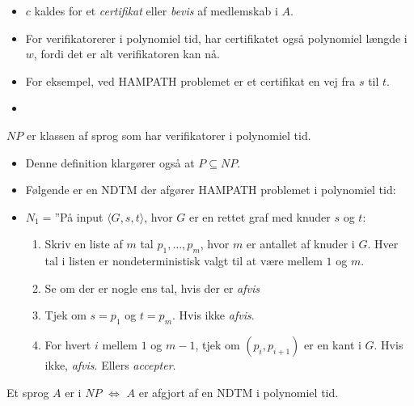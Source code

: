 \begin{frame}[allowframebreaks]
	\begin{itemize}
		\item $c$ kaldes for et \textit{certifikat} eller \textit{bevis} af medlemskab i $A$.
		\item For verifikatorerer i polynomiel tid, har certifikatet også polynomiel længde i $w$, fordi det er alt verifikatoren kan nå.
		\item For eksempel, ved HAMPATH problemet er et certifikat en vej fra $s$ til $t$.
		\item
	\end{itemize}
	\begin{definition}
		$NP$ er klassen af sprog som har verifikatorer i polynomiel tid.
	\end{definition}
	\begin{itemize}
		\item Denne definition klargører også at $P \subseteq NP$.
		\item Følgende er en NDTM der afgører HAMPATH problemet i polynomiel tid:
		\item $N_{1} = $''På input \(\langle G, s, t \rangle\), hvor $G$ er en rettet graf med knuder $s$ og $t$:
		      \begin{enumerate}
			      \item Skriv en liste af $m$ tal $p_{1}, \ldots, p_{m}$, hvor $m$ er antallet af knuder i $G$. Hver tal i listen er nondeterministisk valgt til at være mellem $1$ og $m$.
			      \item Se om der er nogle ens tal, hvis der er \textit{afvis}
			      \item Tjek om $s = p_{1}$ og $t = p_{m}$. Hvis ikke \textit{afvis}.
			      \item For hvert $i$ mellem $1$ og $m-1$, tjek om $(p_{i}, p_{i+1})$ er en kant i $G$. Hvis ikke, \textit{afvis}. Ellers \textit{accepter}.
		      \end{enumerate}
	\end{itemize}

	\begin{theorem}
		Et sprog $A$ er i $NP$ $\iff$ $A$ er afgjort  af en NDTM i polynomiel tid.
	\end{theorem}


\end{frame}
